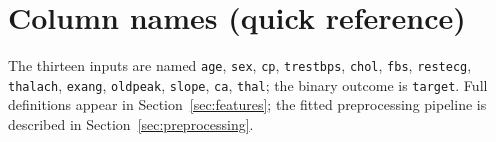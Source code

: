 \documentclass[11pt,a4paper]{article}
\begin{document}
\appendix
\section{Column names (quick reference)}
\label{sec:appendix}

The thirteen inputs are named \texttt{age}, \texttt{sex}, \texttt{cp}, \texttt{trestbps}, \texttt{chol}, \texttt{fbs}, \texttt{restecg}, \texttt{thalach}, \texttt{exang}, \texttt{oldpeak}, \texttt{slope}, \texttt{ca}, \texttt{thal}; the binary outcome is \texttt{target}. Full definitions appear in Section~\ref{sec:features}; the fitted preprocessing pipeline is described in Section~\ref{sec:preprocessing}.
\end{document}
